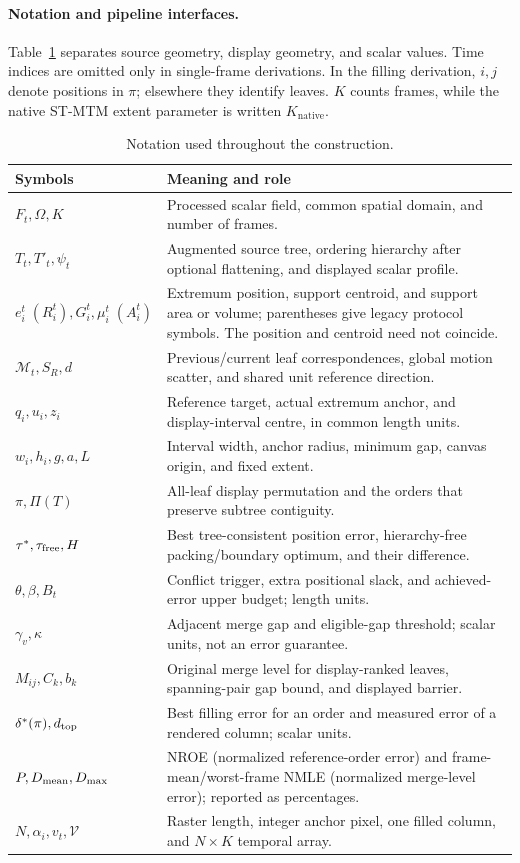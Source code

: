 \paragraph{Notation and pipeline interfaces.}
Table~\ref{tab:notation} separates source geometry, display geometry, and scalar values. Time indices are omitted only in single-frame derivations. In the filling derivation, $i,j$ denote positions in $\pi$; elsewhere they identify leaves. $K$ counts frames, while the native ST-MTM extent parameter is written $K_{\mathrm{native}}$.
\begin{table}[H]\centering\small
\caption{Notation used throughout the construction.}\label{tab:notation}
\begin{tabular}{p{.25\linewidth}p{.67\linewidth}}\toprule
Symbols & Meaning and role\\\midrule
$F_t,\Omega,K$ & Processed scalar field, common spatial domain, and number of frames.\\
$T_t,T'_t,\psi_t$ & Augmented source tree, ordering hierarchy after optional flattening, and displayed scalar profile.\\
$e_i^t\;(R_i^t),G_i^t,\mu_i^t\;(A_i^t)$ & Extremum position, support centroid, and support area or volume; parentheses give legacy protocol symbols. The position and centroid need not coincide.\\
$\mathcal M_t,S_R,d$ & Previous/current leaf correspondences, global motion scatter, and shared unit reference direction.\\
$q_i,u_i,z_i$ & Reference target, actual extremum anchor, and display-interval centre, in common length units.\\
$w_i,h_i,g,a,L$ & Interval width, anchor radius, minimum gap, canvas origin, and fixed extent.\\
$\pi,\Pi(T)$ & All-leaf display permutation and the orders that preserve subtree contiguity.\\
$\tau^*,\tau_{\mathrm{free}},H$ & Best tree-consistent position error, hierarchy-free packing/boundary optimum, and their difference.\\
$\theta,\beta,B_t$ & Conflict trigger, extra positional slack, and achieved-error upper budget; length units.\\
$\gamma_v,\kappa$ & Adjacent merge gap and eligible-gap threshold; scalar units, not an error guarantee.\\
$M_{ij},C_k,b_k$ & Original merge level for display-ranked leaves, spanning-pair gap bound, and displayed barrier.\\
$\delta^*(\pi),d_{\mathrm{top}}$ & Best filling error for an order and measured error of a rendered column; scalar units.\\
$P,D_{\rm mean},D_{\rm max}$ & NROE (normalized reference-order error) and frame-mean/worst-frame NMLE (normalized merge-level error); reported as percentages.\\
$N,\alpha_i,v_t,\mathcal V$ & Raster length, integer anchor pixel, one filled column, and $N\times K$ temporal array.\\\bottomrule
\end{tabular}
\end{table}
